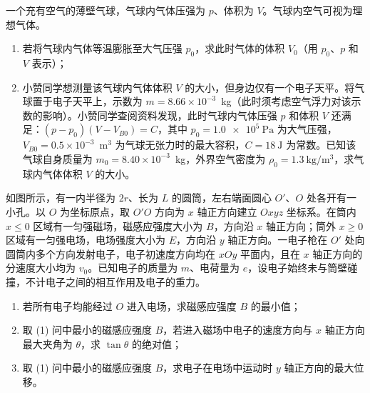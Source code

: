 \begin{question}
一个充有空气的薄壁气球，气球内气体压强为 $p$、体积为 $V$。气球内空气可视为理想气体。

\begin{enumerate}[leftmargin=2em, label=(\arabic*)]
  \item 若将气球内气体等温膨胀至大气压强 $p_{0}$，求此时气体的体积 $V_{0}$（用 $p_{0}$、$p$ 和 $V$ 表示）；
  \item 小赞同学想测量该气球内气体体积 $V$ 的大小，但身边仅有一个电子天平。将气球置于电子天平上，示数为 $m=8.66\times10^{-3}$~kg（此时须考虑空气浮力对该示数的影响）。小赞同学查阅资料发现，此时气球内气体压强 $p$ 和体积 $V$ 还满足：$(p-p_{0})(V-V_{B0})=C$，其中 $p_{0}=\SI{1.0e5}{\pascal}$ 为大气压强，$V_{B0}=0.5\times10^{-3}$~m$^{3}$ 为气球无张力时的最大容积，$C=\SI{18}{\joule}$ 为常数。已知该气球自身质量为 $m_{0}=8.40\times10^{-3}$~kg，外界空气密度为 $\rho_{0}=\SI{1.3}{\kilogram\per\metre\cubed}$，求气球内气体体积 $V$ 的大小。
\end{enumerate}
\end{question}

\begin{question}
如图所示，有一内半径为 $2r$、长为 $L$ 的圆筒，左右端面圆心 $O'$、$O$ 处各开有一小孔。以 $O$ 为坐标原点，取 $O'O$ 方向为 $x$ 轴正方向建立 $Oxyz$ 坐标系。在筒内 $x\le 0$ 区域有一匀强磁场，磁感应强度大小为 $B$，方向沿 $x$ 轴正方向；筒外 $x\ge 0$ 区域有一匀强电场，电场强度大小为 $E$，方向沿 $y$ 轴正方向。一电子枪在 $O'$ 处向圆筒内多个方向发射电子，电子初速度方向均在 $xOy$ 平面内，且在 $x$ 轴正方向的分速度大小均为 $v_{0}$。已知电子的质量为 $m$、电荷量为 $e$，设电子始终未与筒壁碰撞，不计电子之间的相互作用及电子的重力。


\begin{enumerate}[leftmargin=2em, label=(\arabic*)]
  \item 若所有电子均能经过 $O$ 进入电场，求磁感应强度 $B$ 的最小值；
  \item 取 (1) 问中最小的磁感应强度 $B$，若进入磁场中电子的速度方向与 $x$ 轴正方向最大夹角为 $\theta$，求 $\tan\theta$ 的绝对值；
  \item 取 (1) 问中最小的磁感应强度 $B$，求电子在电场中运动时 $y$ 轴正方向的最大位移。
\end{enumerate}
\end{question}

